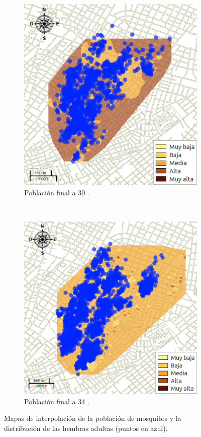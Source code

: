 \begin{figure}[!t]
    \begin{subfigure}[b]{0.225\textwidth}
        \includegraphics[width=\textwidth]{../book/capitulo-6/graphics/raster/temp-30-35.png}
        \caption{ Población final a 30 \textcelsius.}
    \end{subfigure}
    ~~~~
    \begin{subfigure}[b]{0.225\textwidth}
        \includegraphics[width=\textwidth]{../book/capitulo-6/graphics/raster/temp-34-42.png}
        \caption{ Población final a 34 \textcelsius.}
    \end{subfigure}
\caption{\label{fig:poblacion-mapas-all} Mapas de interpolación de la población de mosquitos y la distribución de las hembras adultas (puntos en azul).}
\end{figure}

